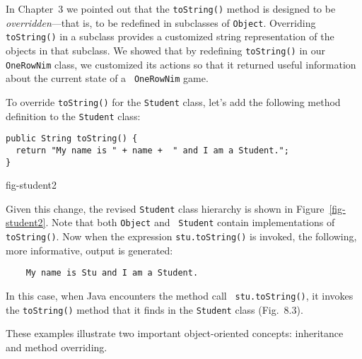 In Chapter~3 we pointed out that the {\tt toString()} method is
designed to be {\em overridden}---that is, to be redefined in
subclasses of {\tt Object}. Overriding {\tt toString()} in a subclass
provides a customized string representation of the objects in that
subclass.  We showed that by redefining {\tt toString()} in our {\tt
OneRowNim} class, we customized its actions so that it returned
useful information about the current state of a {\tt
OneRowNim} game.

To override {\tt toString()} for the {\tt Student} class, let's add
the following method definition to the {\tt Student} class:

\begin{jjjlisting}
\begin{lstlisting}
public String toString() {
  return "My name is " + name +  " and I am a Student.";
}
\end{lstlisting}
\end{jjjlisting}

{fig-student2}


\noindent Given this change, the revised {\tt Student} class hierarchy
is shown in Figure~\ref{fig-student2}.  Note that both {\tt Object} and {\tt
Student} contain implementations of {\tt toString()}. Now when the
expression {\tt stu.toString()} is invoked, the following, more
informative, output is generated:

\begin{jjjlisting}
\begin{lstlisting}
    My name is Stu and I am a Student.
\end{lstlisting}
\end{jjjlisting}

\noindent In this case, when Java encounters the method call {\tt
stu.toString()}, it invokes the {\tt toString()} method that it finds
in the {\tt Student} class (Fig.~8.3).

These examples illustrate two important object-oriented concepts:
inheritance and method overriding.



